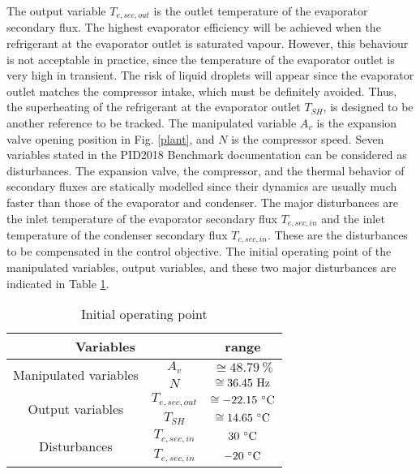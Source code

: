 \documentclass{ifacconf}
\begin{document}
The output variable $T_{e,sec,out}$ is the outlet temperature of the evaporator secondary flux. The highest evaporator efficiency will be achieved when the refrigerant at the evaporator outlet is saturated vapour. However, this behaviour is not acceptable in practice, since the temperature of the evaporator outlet is very high in transient. The risk of liquid droplets will appear since the evaporator outlet matches the compressor intake, which must be definitely avoided. Thus, the superheating of the refrigerant at the evaporator outlet $T_{SH}$, is designed to be another reference to be tracked. The manipulated variable $A_v$ is the expansion valve opening position in Fig. \ref{plant}, and $N$ is the compressor speed. Seven variables stated in the PID2018 Benchmark documentation \citep{Bejarano2018} can be considered as disturbances. The expansion valve, the compressor, and the thermal behavior of secondary fluxes are statically modelled since their dynamics are usually much faster than those of the evaporator and condenser. The major disturbances are the inlet temperature of the evaporator secondary flux $T_{e,sec,in}$ and the inlet temperature of the condenser secondary flux $T_{c,sec,in}$. These are the disturbances to be compensated in the control objective. The initial operating point of the manipulated variables, output variables, and these two major disturbances are indicated in Table \ref{initial}.

\begin{table}[htbp]
\centering
\caption{Initial operating point}
\label{initial}
\begin{tabular}{|c|c|c|}
\hline
\multicolumn{2}{|c|}{Variables}                    &           range            \\ \hline
\multirow{2}{*}{Manipulated variables} &         $A_v$              &       $\cong 48.79\ \%$                 \\ \cline{2-3}
                  &          $N$             &        $\cong 36.45\  \rm{Hz}$                \\ \hline
\multirow{2}{*}{Output variables} &            $T_{e,sec,out}$ & $\cong -22.15\ ^{\circ} \rm{C}$ \\ \cline{2-3}
                  & $T_{SH}$                            & $\cong 14.65\ ^{\circ} \rm{C}$ \\ \hline
\multirow{2}{*}{Disturbances} &             $T_{c,sec,in}$          &       $30\  ^{\circ} \rm{C}$              \\ \cline{2-3}
                  &          $T_{e,sec,in}$             &            $-20\ ^{ \circ }\rm{C}$           \\ \hline
\end{tabular}
\end{table}
\end{document}
